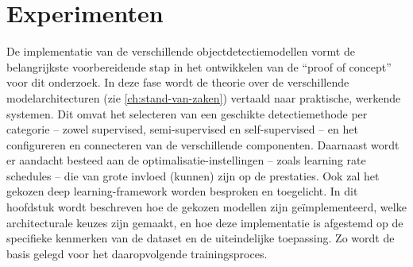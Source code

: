 \chapter{Experimenten}
\label{ch:experimenten}

De implementatie van de verschillende objectdetectiemodellen vormt de belangrijkste voorbereidende stap in het ontwikkelen van de ``proof of concept'' voor dit onderzoek. In deze fase wordt de theorie over de verschillende modelarchitecturen (zie \ref{ch:stand-van-zaken}) vertaald naar praktische, werkende systemen. Dit omvat het selecteren van een geschikte detectiemethode per categorie -- zowel supervised, semi-supervised en self-supervised -- en het configureren en connecteren van de verschillende componenten. Daarnaast wordt er aandacht besteed aan de optimalisatie-instellingen -- zoals learning rate schedules -- die van grote invloed (kunnen) zijn op de prestaties. Ook zal het gekozen deep learning-framework worden besproken en toegelicht. In dit hoofdstuk wordt beschreven hoe de gekozen modellen zijn geïmplementeerd, welke architecturale keuzes zijn gemaakt, en hoe deze implementatie is afgestemd op de specifieke kenmerken van de dataset en de uiteindelijke toepassing. Zo wordt de basis gelegd voor het daaropvolgende trainingsproces.







